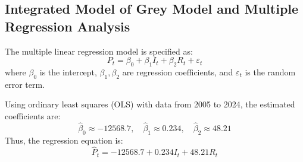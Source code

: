\documentclass{mcmthesis}
\begin{document}


\subsection{Integrated Model of Grey Model and Multiple Regression Analysis} %



The multiple linear regression model is specified as:
\begin{equation}
P_t = \beta_0 + \beta_1 I_t + \beta_2 R_t + \varepsilon_t
\label{eq:regression_model}
\end{equation}
where \( \beta_0 \) is the intercept, \( \beta_1, \beta_2 \) are regression coefficients, and \( \varepsilon_t \) is the random error term.

Using ordinary least squares (OLS) with data from 2005 to 2024, the estimated coefficients are:
\begin{equation}
\hat{\beta}_0 \approx -12568.7, \quad \hat{\beta}_1 \approx 0.234, \quad \hat{\beta}_2 \approx 48.21
\label{eq:coefficients}
\end{equation}
Thus, the regression equation is:
\begin{equation}
\hat{P}_t = -12568.7 + 0.234 I_t + 48.21 R_t
\label{eq:regression_equation}
\end{equation}
\end{document}
